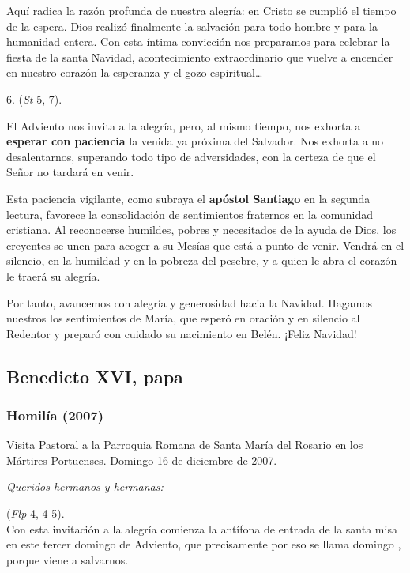 Aquí radica la razón profunda de nuestra alegría: en Cristo se cumplió el tiempo de la espera. Dios realizó finalmente la salvación para todo hombre y para la humanidad entera. Con esta íntima convicción nos preparamos para celebrar la fiesta de la santa Navidad, acontecimiento extraordinario que vuelve a encender en nuestro corazón la esperanza y el gozo espiritual\ldots{}

6.  (\emph{St} 5, 7).

El Adviento nos invita a la alegría, pero, al mismo tiempo, nos exhorta a \textbf{esperar con paciencia} la venida ya próxima del Salvador. Nos exhorta a no desalentarnos, superando todo tipo de adversidades, con la certeza de que el Señor no tardará en venir.

Esta paciencia vigilante, como subraya el \textbf{apóstol Santiago} en la segunda lectura, favorece la consolidación de sentimientos fraternos en la comunidad cristiana. Al reconocerse humildes, pobres y necesitados de la ayuda de Dios, los creyentes se unen para acoger a su Mesías que está a punto de venir. Vendrá en el silencio, en la humildad y en la pobreza del pesebre, y a quien le abra el corazón le traerá su alegría.

Por tanto, avancemos con alegría y generosidad hacia la Navidad. Hagamos nuestros los sentimientos de María, que esperó en oración y en silencio al Redentor y preparó con cuidado su nacimiento en Belén. ¡Feliz Navidad!

\subsection{Benedicto XVI, papa}

\subsubsection{Homilía (2007)} 

Visita Pastoral a la Parroquia Romana de Santa María del Rosario en los Mártires Portuenses. Domingo 16 de diciembre de 2007.

\emph{Queridos hermanos y hermanas:}

 (\emph{Flp} 4, 4-5).\\ Con esta invitación a la alegría comienza la antífona de entrada de la santa misa en este tercer domingo de Adviento, que precisamente por eso se llama domingo , porque viene a salvarnos.

